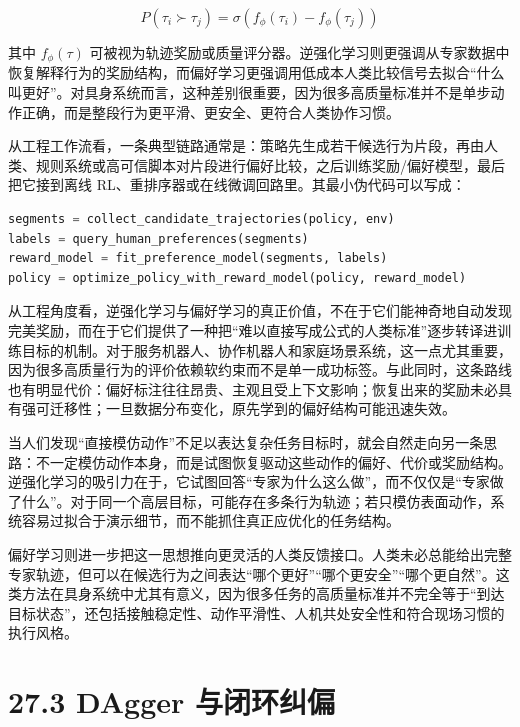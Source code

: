 \begingroup
\footnotesize
\begin{equation*}
P(\tau_i \succ \tau_j) = \sigma(f_\phi(\tau_i) - f_\phi(\tau_j))
\end{equation*}
\endgroup

其中 \(f_\phi(\tau)\) 可被视为轨迹奖励或质量评分器。逆强化学习则更强调从专家数据中恢复解释行为的奖励结构，而偏好学习更强调用低成本人类比较信号去拟合“什么叫更好”。对具身系统而言，这种差别很重要，因为很多高质量标准并不是单步动作正确，而是整段行为更平滑、更安全、更符合人类协作习惯。

从工程工作流看，一条典型链路通常是：策略先生成若干候选行为片段，再由人类、规则系统或高可信脚本对片段进行偏好比较，之后训练奖励/偏好模型，最后把它接到离线 RL、重排序器或在线微调回路里。其最小伪代码可以写成：

\begin{lstlisting}[language=python]
segments = collect_candidate_trajectories(policy, env)
labels = query_human_preferences(segments)
reward_model = fit_preference_model(segments, labels)
policy = optimize_policy_with_reward_model(policy, reward_model)
\end{lstlisting}

从工程角度看，逆强化学习与偏好学习的真正价值，不在于它们能神奇地自动发现完美奖励，而在于它们提供了一种把“难以直接写成公式的人类标准”逐步转译进训练目标的机制。对于服务机器人、协作机器人和家庭场景系统，这一点尤其重要，因为很多高质量行为的评价依赖软约束而不是单一成功标签。与此同时，这条路线也有明显代价：偏好标注往往昂贵、主观且受上下文影响；恢复出来的奖励未必具有强可迁移性；一旦数据分布变化，原先学到的偏好结构可能迅速失效。

当人们发现“直接模仿动作”不足以表达复杂任务目标时，就会自然走向另一条思路：不一定模仿动作本身，而是试图恢复驱动这些动作的偏好、代价或奖励结构。逆强化学习的吸引力在于，它试图回答“专家为什么这么做”，而不仅仅是“专家做了什么”。对于同一个高层目标，可能存在多条行为轨迹；若只模仿表面动作，系统容易过拟合于演示细节，而不能抓住真正应优化的任务结构。

偏好学习则进一步把这一思想推向更灵活的人类反馈接口。人类未必总能给出完整专家轨迹，但可以在候选行为之间表达“哪个更好”“哪个更安全”“哪个更自然”。这类方法在具身系统中尤其有意义，因为很多任务的高质量标准并不完全等于“到达目标状态”，还包括接触稳定性、动作平滑性、人机共处安全性和符合现场习惯的执行风格。

\section*{27.3 DAgger 与闭环纠偏}


